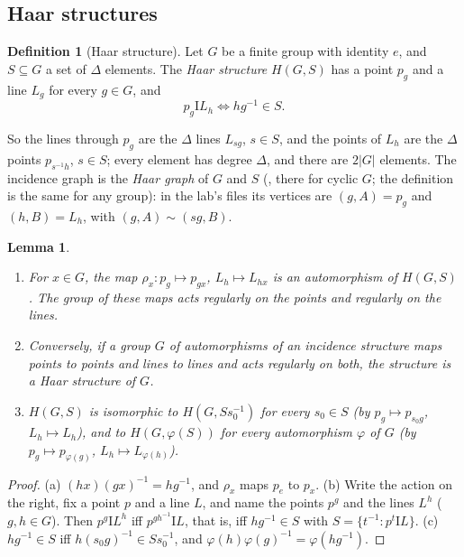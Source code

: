 \documentclass[11pt]{amsart}
\newtheorem{lemma}[theorem]{Lemma}
\theoremstyle{definition}
\newtheorem{definition}[theorem]{Definition}
\theoremstyle{remark}
\newcommand{\I}{\mathrel{\mathrm{I}}}
\begin{document}
\subsection{Haar structures}\label{ssec:haardef}

\begin{definition}[Haar structure]\label{def:haar}
Let $G$ be a finite group with identity $e$, and $S\subseteq G$ a set of $\Delta$ elements. The \emph{Haar structure} $H(G,S)$ has a point $p_g$ and a line $L_g$ for every $g\in G$, and
$$p_g\I L_h\iff hg^{-1}\in S.$$
\end{definition}

So the lines through $p_g$ are the $\Delta$ lines $L_{sg}$, $s\in S$, and the points of $L_h$ are the $\Delta$ points $p_{s^{-1}h}$, $s\in S$; every element has degree $\Delta$, and there are $2|G|$ elements. The incidence graph is the \emph{Haar graph} of $G$ and $S$ (\cite{HMP02}, there for cyclic $G$; the definition is the same for any group): in the lab's files its vertices are $(g,A)=p_g$ and $(h,B)=L_h$, with $(g,A)\sim(sg,B)$.

\begin{lemma}\label{lem:regular}
\begin{enumerate}[label=\textup{(\alph*)}]
\item For $x\in G$, the map $\rho_x\colon p_g\mapsto p_{gx}$, $L_h\mapsto L_{hx}$ is an automorphism of $H(G,S)$. The group of these maps acts regularly on the points and regularly on the lines.
\item Conversely, if a group $G$ of automorphisms of an incidence structure maps points to points and lines to lines and acts regularly on both, the structure is a Haar structure of $G$.
\item $H(G,S)$ is isomorphic to $H(G,Ss_0^{-1})$ for every $s_0\in S$ (by $p_g\mapsto p_{s_0g}$, $L_h\mapsto L_h$), and to $H(G,\varphi(S))$ for every automorphism $\varphi$ of $G$ (by $p_g\mapsto p_{\varphi(g)}$, $L_h\mapsto L_{\varphi(h)}$).
\end{enumerate}
\end{lemma}

\begin{proof}
(a) $(hx)(gx)^{-1}=hg^{-1}$, and $\rho_x$ maps $p_e$ to $p_x$. (b) Write the action on the right, fix a point $p$ and a line $L$, and name the points $p^g$ and the lines $L^h$ ($g,h\in G$). Then $p^g\I L^h$ iff $p^{gh^{-1}}\I L$, that is, iff $hg^{-1}\in S$ with $S=\{t^{-1}: p^t\I L\}$. (c) $hg^{-1}\in S$ iff $h(s_0g)^{-1}\in Ss_0^{-1}$, and $\varphi(h)\varphi(g)^{-1}=\varphi(hg^{-1})$.
\end{proof}
\end{document}
